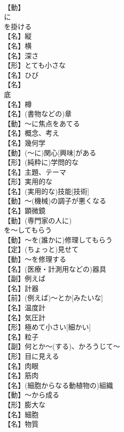 \documentclass[8pt]{extreport}
\begin{document}
\begin{CJK}{UTF8}{min}
\\	【動】
\\	に
\\	を掛ける
\\	【名】縦
\\	【名】横
\\	【名】深さ
\\	【形】とても小さな
\\	【名】ひび
\\	【名】
\\	底
\\	【名】樽
\\	【名】(書物などの)章
\\	【動】～に焦点をあてる
\\	【名】概念、考え
\\	【名】幾何学
\\	【動】(～に)関心[興味]がある
\\	【形】(純粋に)学問的な
\\	【名】主題、テーマ
\\	【形】実用的な
\\	【名】(実用的な)技能[技術]
\\	【動】～(機械)の調子が悪くなる
\\	【名】顕微鏡
\\	【動】(専門家の人に)
\\	を～してもらう
\\	【動】～を(誰かに)修理してもらう
\\	【定】(ちょっと)見せて
\\	【動】～を修理する
\\	【名】(医療・計測用などの)器具
\\	【副】例えば
\\	【名】計器
\\	【前】(例えば)～とか[みたいな]
\\	【名】温度計
\\	【名】気圧計
\\	【形】極めて小さい[細かい]
\\	【名】粒子
\\	【副】何とか～(する)、かろうじて～
\\	【形】目に見える
\\	【名】肉眼
\\	【名】筋肉
\\	【名】(細胞からなる動植物の)組織
\\	【動】～から成る
\\	【形】膨大な
\\	【名】細胞
\\	【名】物質

\end{CJK}
\end{document}
